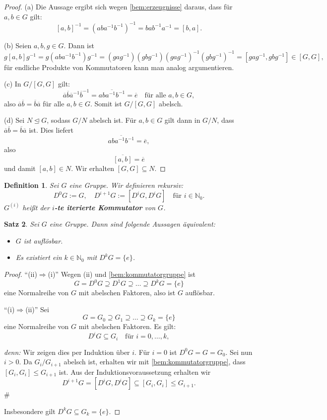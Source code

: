 \documentclass[a4paper, twoside, 11pt, ngerman]{report}
\newcommand{\NN}{\mathds N}
\theoremstyle{definistyle}
\newtheorem{satz}{Satz}[section]
\newtheorem{defini}[satz]{Definition}
\theoremstyle{remark}
\newenvironment{denn}%
  {\par\textit{denn:}}%
  {\hfill\#\par}
\newcommand{\defn}[1]{\textit{\bfseries #1}}
\begin{document}
\begin{proof}
(a) Die Aussage ergibt sich wegen \ref{bem:erzeugnisse} daraus, dass für $a, b \in G$ gilt:
\[
[a, b]^{-1} = (aba^{-1}b^{-1})^{-1} = bab^{-1}a^{-1} = [b, a].
\]

(b) Seien $a, b, g \in G$. Dann ist
\[
g[a, b]g^{-1} = g (aba^{-1}b^{-1}) g^{-1} = (gag^{-1})(gbg^{-1})(gag^{-1})^{-1}(gbg^{-1})^{-1}
=[gag^{-1},gbg^{-1}]\in[G,G],
\]
für endliche Produkte von Kommutatoren kann man analog argumentieren.

(c) In $G / [G, G]$ gilt:
\[
\overline{a}\overline{b}\overline{a}^{-1}\overline{b}^{-1} = \overline{aba^{-1}b^{-1}} = \overline{e} \quad \text{für alle } a, b \in G,
\]
also $\overline{a}\overline{b} = \overline{b}\overline{a}$ für alle $a, b \in G$. Somit ist $G / [G, G]$ abelsch.

(d) Sei $N \trianglelefteq G$, sodass $G / N$ abelsch ist. Für $a, b \in G$ gilt dann in $G/N$, dass
$\overline{a}\overline{b} = \overline{b}\overline{a}$ ist. Dies liefert
\[
\overline{aba^{-1}b^{-1}} = \overline{e},
\]
also
\[
\overline{[a,b]}=\overline{e}
\]
und damit $[a,b]\in N$. Wir erhalten $[G, G] \subseteq N$.
\end{proof}

\begin{defini}\label{def:iterierter_kommutator}
Sei $ G $ eine Gruppe. Wir definieren rekursiv:
\[
D^0G := G, \quad D^{i+1}G := [D^iG, D^iG] \quad \text{für } i \in \NN_0.
\]
$ G^{(i)} $ heißt der \defn{$i$-te iterierte Kommutator} von $ G $.
\end{defini}

\begin{satz}\label{satz:char_auflösbarkeit}
Sei $ G $ eine Gruppe. Dann sind folgende Aussagen äquivalent:
\begin{itemize}
    \item[(i)] $ G $ ist auflösbar.
    \item[(ii)] Es existiert ein $ k \in \NN_0 $ mit $D^k G = \{e\} $.
\end{itemize}
\end{satz}

\begin{proof}
"`(ii)$\Rightarrow$(i)"' Wegen (ii) und \ref{bem:kommutatorgruppe} ist
\[
G = D^0G \supseteq D^1G\supseteq \dots \supseteq D^kG = \{e\}
\]
eine Normalreihe von $ G $ mit abelschen Faktoren, also ist $ G $ auflösbar.

"`(i)$\Rightarrow$(ii)"' Sei
\[
G = G_0 \supseteq G_1 \supseteq \dots \supseteq G_k = \{e\}
\]
eine Normalreihe von $ G $ mit abelschen Faktoren. Es gilt:
\[
D^iG \subseteq G_i \quad \text{für } i = 0, \dots, k,
\]
\begin{denn} 
Wir zeigen dies per Induktion über $ i $. Für $i=0$ ist $D^0G =G = G_0$. Sei nun $i>0$.
Da $G_i / G_{i+1} $ abelsch ist, erhalten wir mit \ref{bem:kommutatorgruppe}, dass $[G_i, G_i] \leq G_{i+1}$ ist.
Aus der Induktionsvoraussetzung erhalten wir
\[
D^{i+1}G = [D^iG, D^iG] \subseteq [G_i, G_i] \leq G_{i+1}.
\]
\end{denn}
Insbesondere gilt $D^kG \subseteq G_k = \{e\} $.
\end{proof}
\end{document}
